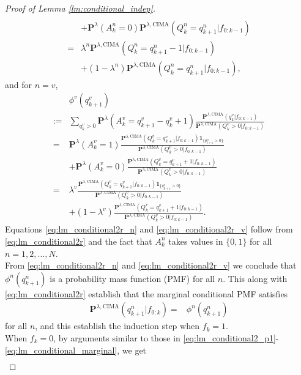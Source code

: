 \documentclass[onecolumn,draftcls]{IEEEtran}
\newcommand{\g}{\text{CIMA}}
\begin{document}
\begin{proof}[Proof of Lemma \ref{lm:conditional_indep}]
\begin{align}
\nonumber\\
&+\mathbf{P}^{\lambda}(A^n_k = 0)\mathbf{P}^{\lambda,\g}(Q^n_k = q^n_{k+1}|f_{0:k-1})
\nonumber\\
=&\lambda^n\mathbf{P}^{\lambda,\g}(Q^n_k = q^n_{k+1}-1|f_{0:k-1})
\nonumber\\
&+(1-\lambda^n)\mathbf{P}^{\lambda,\g}(Q^n_k = q^n_{k+1}|f_{0:k-1}),
\label{eq:lm_conditional2r_n}
\end{align}
and for $n=v$,
\begin{align}
&\phi^v(q^v_{k+1})\nonumber\\
:= &
\sum_{q^{v}_{k}>0}\mathbf{P}^{\lambda}(A^v_k = q^v_{k+1}-q^v_{k}+1)
\frac{\mathbf{P}^{\lambda,\g}(q^v_{k}|f_{0:k-1})}{\mathbf{P}^{\lambda,\g}(Q^v_{k}>0|f_{0:k-1})} \nonumber\\
= & \mathbf{P}^{\lambda}(A^v_k = 1)
\frac{\mathbf{P}^{\lambda,\g}(Q^v_{k} = q^v_{k+1}|f_{0:k-1})\mathbf{1}_{\{q^n_{t+1}>0\}}}{\mathbf{P}^{\lambda,\g}(Q^v_{k}>0|f_{0:k-1})}
\nonumber\\
&+ \mathbf{P}^{\lambda}(A^v_k = 0)
\frac{\mathbf{P}^{\lambda,\g}(Q^v_{k} = q^v_{k+1}+1|f_{0:k-1})}{\mathbf{P}^{\lambda,\g}(Q^v_{k}>0|f_{0:k-1})}
\nonumber\\
= & \lambda^v
\frac{\mathbf{P}^{\lambda,\g}(Q^v_{k} = q^v_{k+1}|f_{0:k-1})\mathbf{1}_{\{q^v_{k+1}>0\}}}{\mathbf{P}^{\lambda,\g}(Q^v_{k}>0|f_{0:k-1})}
\nonumber\\
&+ (1-\lambda^v)
\frac{\mathbf{P}^{\lambda,\g}(Q^v_{k} = q^v_{k+1}+1|f_{0:k-1})}{\mathbf{P}^{\lambda,\g}(Q^v_{k}>0|f_{0:k-1})}.
\label{eq:lm_conditional2r_v}
\end{align}
Equations \eqref{eq:lm_conditional2r_n} and \eqref{eq:lm_conditional2r_v} follow from \eqref{eq:lm_conditional2r} and the fact that $A^n_k$ takes values in $\{0,1\}$ for all $n=1,2,\dots,N$.
\\
From \eqref{eq:lm_conditional2r_n} and \eqref{eq:lm_conditional2r_v} we conclude that $\phi^n(q^n_{k+1})$ is a probability mass function (PMF) for all $n$. This along with \eqref{eq:lm_conditional2r} establish that the marginal conditional PMF satisfies
\begin{align}
\mathbf{P}^{\lambda,\g}(q^n_{k+1}|f_{0:k}) 
=&\phi^n(q^n_{k+1})
\label{eq:lm_conditional_marginal}
\end{align}
for all $n$, and this establish the induction step when $f_k=1$.
\\
When $f_k = 0$, by arguments similar to those in \eqref{eq:lm_conditional2_p1}-\eqref{eq:lm_conditional_marginal}, we get
\begin{align}

\end{align}
\end{proof}
\end{document}
